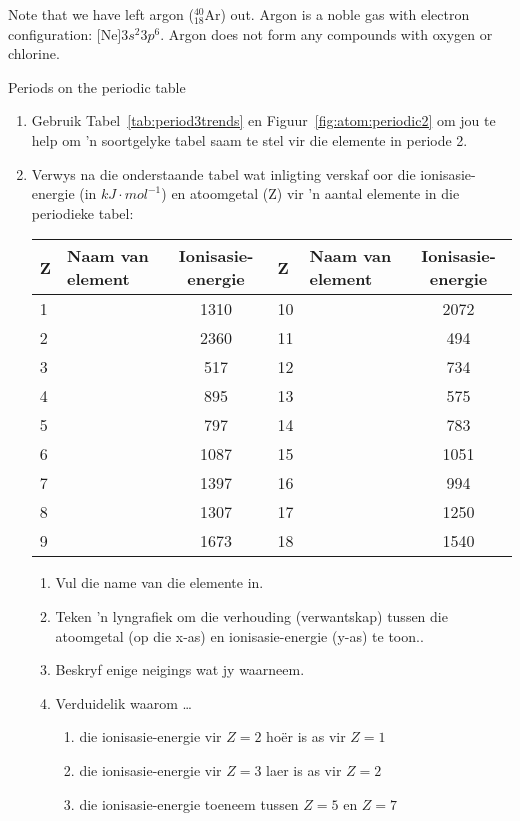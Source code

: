 Note that we have left argon ($^{40}_{18}\text{Ar}$) out. Argon is a noble gas with electron configuration: $\text{[Ne]}3s^{2}3p^{6}$. Argon does not form any compounds with oxygen or chlorine.
\begin{exercises}{Periods on the periodic table}
{
\begin{enumerate}[noitemsep, label=\textbf{\arabic*}. ]
\item Gebruik Tabel~\ref{tab:period3trends} en Figuur~\ref{fig:atom:periodic2} om jou te help om 'n soortgelyke tabel saam te stel vir die elemente in periode 2.
\item Verwys na die onderstaande tabel wat inligting verskaf oor die ionisasie-energie (in $kJ \cdot mol^{-1}$) en atoomgetal (Z) vir 'n aantal elemente in die periodieke tabel:\\
\begin{center}
\begin{tabular}{|l|l|c|l|l|c|}\hline
\textbf{Z} & Naam van element & Ionisasie-energie & \textbf{Z} & Naam van element & Ionisasie-energie \\\hline
1 &   & 1310 & 10 &        & 2072 \\\hline
2 &     & 2360 & 11 &      & 494  \\\hline
3 &    & 517  & 12 &   & 734  \\\hline
4 &  & 895  & 13 &   & 575  \\\hline
5 &      & 797  & 14 &     & 783  \\\hline
6 &     & 1087 & 15 &  & 1051 \\\hline
7 &   & 1397 & 16 &     & 994  \\\hline
8 &     & 1307 & 17 &    & 1250 \\\hline
9 &   & 1673 & 18 &       & 1540 \\\hline
\end{tabular}
\end{center}

\begin{enumerate}[noitemsep, label=\textbf{\alph*}. ]
 \item Vul die name van die elemente in.
\item Teken 'n lyngrafiek om die verhouding (verwantskap) tussen die atoomgetal (op die x-as) en ionisasie-energie (y-as) te toon..
\item Beskryf enige neigings wat jy waarneem.
\item Verduidelik waarom \ldots
	\begin{enumerate}[noitemsep, label=\textbf{\roman*}. ]
	\item die ionisasie-energie vir $Z=2$ ho\"{e}r is as vir $Z=1$
	\item die ionisasie-energie vir $Z=3$ laer is as vir $Z=2$
	\item die ionisasie-energie toeneem tussen $Z=5$ en $Z=7$
	\end{enumerate}

\end{enumerate}
\end{enumerate}

}
\end{exercises}


